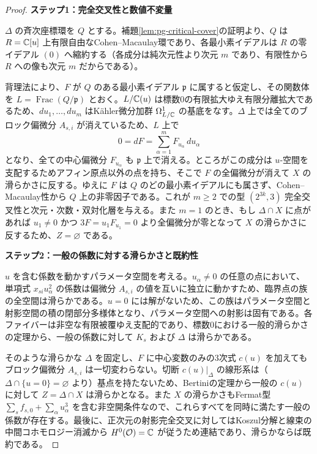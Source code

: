 \begin{proof}
\par\medskip\noindent\textbf{ステップ1：完全交叉性と数値不変量}\par\nobreak\smallskip
$\Delta$ の斉次座標環を $Q$ とする。補題\ref{lem:pg-critical-cover}の証明より、$Q$ は $R=\mathbb C[u]$ 上有限自由なCohen--Macaulay環であり、各最小素イデアルは $R$ の零イデアル $(0)$ へ縮約する（各成分は純次元性より次元 $m$ であり、有限性から $R$ への像も次元 $m$ だからである）。

背理法により、$F$ が $Q$ のある最小素イデアル $\mathfrak p$ に属すると仮定し、その関数体を $L=\operatorname{Frac}(Q/\mathfrak p)$ とおく。$L/\mathbb C(u)$ は標数0の有限拡大ゆえ有限分離拡大であるため、$du_1,\ldots,du_m$ はK\"ahler微分加群 $\Omega^1_{L/\mathbb C}$ の基底をなす。$\Delta$ 上では全てのブロック偏微分 $A_{s,i}$ が消えているため、$L$ 上で
\[
  0=dF=\sum_{\alpha=1}^m F_{u_\alpha}\,du_\alpha
\]
となり、全ての中心偏微分 $F_{u_\alpha}$ も $\mathfrak p$ 上で消える。ところがこの成分は $u$-空間を支配するためアフィン原点以外の点を持ち、そこで $F$ の全偏微分が消えて $X$ の滑らかさに反する。ゆえに $F$ は $Q$ のどの最小素イデアルにも属さず、Cohen--Macaulay性から $Q$ 上の非零因子である。これが $m\ge2$ での型 $(2^{3k},3)$ 完全交叉性と次元・次数・双対化層を与える。また $m=1$ のとき、もし $\Delta\cap X$ に点があれば $u_1\ne0$ かつ $3F=u_1 F_{u_1}=0$ より全偏微分が零となって $X$ の滑らかさに反するため、$Z=\varnothing$ である。

\par\medskip\noindent\textbf{ステップ2：一般の係数に対する滑らかさと既約性}\par\nobreak\smallskip
$u$ を含む係数を動かすパラメータ空間を考える。$u_\alpha\ne0$ の任意の点において、単項式 $x_{si}u_\alpha^2$ の係数は偏微分 $A_{s,i}$ の値を互いに独立に動かすため、臨界点の族の全空間は滑らかである。$u=0$ には解がないため、この族はパラメータ空間と射影空間の積の閉部分多様体となり、パラメータ空間への射影は固有である。各ファイバーは非空な有限被覆ゆえ支配的であり、標数0における一般的滑らかさの定理から、一般の係数に対して $K_s$ および $\Delta$ は滑らかである。

そのような滑らかな $\Delta$ を固定し、$F$ に中心変数のみの3次式 $c(u)$ を加えてもブロック偏微分 $A_{s,i}$ は一切変わらない。切断 $c(u)|_\Delta$ の線形系は（$\Delta\cap\{u=0\}=\varnothing$ より）基点を持たないため、Bertiniの定理から一般の $c(u)$ に対して $Z=\Delta\cap X$ は滑らかとなる。また $X$ の滑らかさもFermat型 $\sum_s f_{s,0}+\sum_\alpha u_\alpha^3$ を含む非空開条件なので、これらすべてを同時に満たす一般の係数が存在する。最後に、正次元の射影完全交叉に対してはKoszul分解と線束の中間コホモロジー消滅から $H^0(\mathcal O)=\mathbb C$ が従うため連結であり、滑らかならば既約である。
\end{proof}

